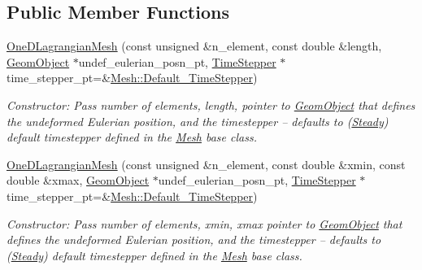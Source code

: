 \subsection*{Public Member Functions}
\begin{DoxyCompactItemize}
\item 
\hyperlink{classoomph_1_1OneDLagrangianMesh_a7061998be3fb4131c6b58c4943595d49}{One\+D\+Lagrangian\+Mesh} (const unsigned \&n\+\_\+element, const double \&length, \hyperlink{classoomph_1_1GeomObject}{Geom\+Object} $\ast$undef\+\_\+eulerian\+\_\+posn\+\_\+pt, \hyperlink{classoomph_1_1TimeStepper}{Time\+Stepper} $\ast$time\+\_\+stepper\+\_\+pt=\&\hyperlink{classoomph_1_1Mesh_a12243d0fee2b1fcee729ee5a4777ea10}{Mesh\+::\+Default\+\_\+\+Time\+Stepper})
\begin{DoxyCompactList}\small\item\em Constructor\+: Pass number of elements, length, pointer to \hyperlink{classoomph_1_1GeomObject}{Geom\+Object} that defines the undeformed Eulerian position, and the timestepper -- defaults to (\hyperlink{classoomph_1_1Steady}{Steady}) default timestepper defined in the \hyperlink{classoomph_1_1Mesh}{Mesh} base class. \end{DoxyCompactList}\item 
\hyperlink{classoomph_1_1OneDLagrangianMesh_a20e1ab05b023f65bea5503938cd70385}{One\+D\+Lagrangian\+Mesh} (const unsigned \&n\+\_\+element, const double \&xmin, const double \&xmax, \hyperlink{classoomph_1_1GeomObject}{Geom\+Object} $\ast$undef\+\_\+eulerian\+\_\+posn\+\_\+pt, \hyperlink{classoomph_1_1TimeStepper}{Time\+Stepper} $\ast$time\+\_\+stepper\+\_\+pt=\&\hyperlink{classoomph_1_1Mesh_a12243d0fee2b1fcee729ee5a4777ea10}{Mesh\+::\+Default\+\_\+\+Time\+Stepper})
\begin{DoxyCompactList}\small\item\em Constructor\+: Pass number of elements, xmin, xmax pointer to \hyperlink{classoomph_1_1GeomObject}{Geom\+Object} that defines the undeformed Eulerian position, and the timestepper -- defaults to (\hyperlink{classoomph_1_1Steady}{Steady}) default timestepper defined in the \hyperlink{classoomph_1_1Mesh}{Mesh} base class. \end{DoxyCompactList}\end{DoxyCompactItemize}
